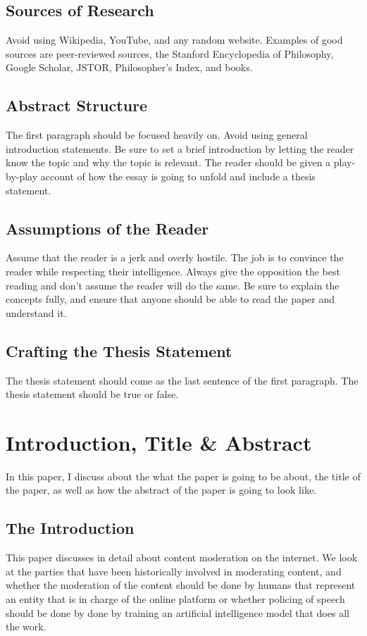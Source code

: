 \documentclass[a4paper]{article}
\begin{document}
\subsection{Sources of Research}
Avoid using Wikipedia, YouTube, and any random website. Examples of good sources are peer-reviewed sources, the Stanford 
Encyclopedia of Philosophy, Google Scholar, JSTOR, Philosopher's Index, and books.

\subsection{Abstract Structure}
The first paragraph should be focused heavily on. Avoid using general introduction statements. Be sure to set a brief
introduction by letting the reader know the topic and why the topic is relevant. The reader should be given a 
play-by-play account of how the essay is going to unfold and include a thesis statement. 

\subsection{Assumptions of the Reader}
Assume that the reader is a jerk and overly hostile. The job is to convince the reader while respecting their 
intelligence. Always give the opposition the best reading and don't assume the reader will do the same. Be sure to 
explain the  concepts fully, and ensure that anyone should be able to read the paper and understand it. 

\subsection{Crafting the Thesis Statement}
The thesis statement should come as the last sentence of the first paragraph. The thesis statement should be true or
false. 

\newpage

\section{Introduction, Title \& Abstract}
In this paper, I discuss about the what the paper is going to be about, the title of the paper, as well as how the
abstract of the paper is going to look like.

\subsection{The Introduction}
This paper discusses in detail about content moderation on the internet. We look at the parties that have been 
historically involved in moderating content, and whether the moderation of the content should be done by humans that
represent an entity that is in charge of the online platform or whether policing of speech should be done by done 
by training an artificial intelligence model that does all the work.
\end{document}

